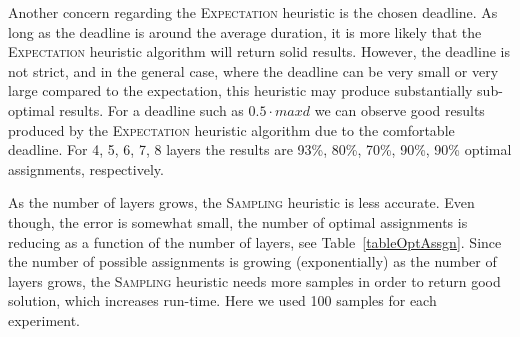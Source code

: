 \documentclass[letterpaper]{article} %
\newcommand{\commentout}[1]{}
\newcommand{\astar}{\textsc{A*}\xspace}
\newcommand{\sampling}{\textsc{Sampling}\xspace}
\newcommand{\expectation}{\textsc{Expectation}\xspace}
\begin{document}
Another concern regarding the \expectation heuristic is the chosen deadline. As long as the deadline is around the average duration, it is more likely that the \expectation heuristic algorithm will return solid results. However, the deadline is not strict, and in the general case, where the deadline can be very small or very large compared to the expectation, this heuristic may produce substantially sub-optimal results. For a deadline such as $0.5\cdot maxd$ we can observe good results produced by the \expectation heuristic algorithm due to the comfortable deadline. For 4, 5, 6, 7, 8 layers the results are 93\%, 80\%, 70\%, 90\%, 90\% optimal assignments, respectively. 

\commentout{
\begin{figure}[h!]
	\scriptsize	
	\begin{tikzpicture}
	\begin{axis}[
	scale=0.7,
	xlabel={\#Layers},
	ylabel near ticks,
	ylabel={\#Opt assignments},
	xmin=4, xmax=8,
	ymin=0, ymax=30,
	legend pos=outer north east,
	ymajorgrids=true,
	grid style=dashed,
	]
	
	\addplot[
	color=blue,
	mark=x,
	]
	coordinates { 
		(4 , 30) 
		(5 , 30) 
		(6 , 30)
		(7 , 30) 
		(8 , 30)
		
	};
	\addlegendentry{BF}
	
	\addplot[
	color=gray,
	mark=x,
	]
	coordinates { 
		(4 , 30) 
		(5 , 30) 
		(6 , 30)
		(7 , 30) 
		(8 , 30)
		
	};
	\addlegendentry{\astar}
	
	\addplot[
	color=green,
	mark=o,
	]
	coordinates { 
		(4 , 30) 
		(5 , 29) 
		(6 , 25)
		(7 , 21) 
        (8 , 22)
	};
	\addlegendentry{\sampling}
	
	
	\addplot[
	color=red,
	mark=square,
	]
	coordinates {
		(4 , 28) 
		(5 , 24) 
		(6 , 21)
		(7 , 27)
		(8 , 27)

	};
	\addlegendentry{\expectation}
	
	
	
	\end{axis}
	\end{tikzpicture}
	\caption{Number of optimal assignments comparison of all heuristic algorithms for deadline of size $0.5\cdot maxd$ and ``Structural" distribution}\label{05reg}
\end{figure}}

As the number of layers grows, the \sampling heuristic is less accurate. Even though, the error is somewhat small, the number of optimal assignments is reducing as a function of the number of layers, see Table~\ref{tableOptAssgn}. Since the number of possible assignments is growing (exponentially) as the number of layers grows, the \sampling heuristic needs more samples in order to return good solution, which increases run-time. Here we used 100 samples for each experiment.
\end{document}
